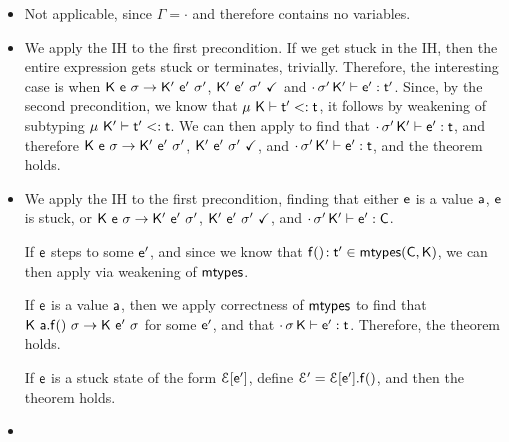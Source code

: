 \documentclass[a4paper,USenglish]{tex/lipics-v2016}
\begin{document}
\begin{itemize}
  \item {}
        Not applicable, since $\Gamma = \cdot$ and therefore contains no variables.
  \item {}

        We apply the IH to the first precondition. If we get stuck in the IH, then the entire
        expression gets stuck or terminates, trivially. Therefore, the interesting case is when
        ${{\sf{K}}}~{{\sf{e}}}~{\sigma} \rightarrow {{\ensuremath{{\sf{K'}}}}}~{{{{\sf{e'}}}}}~{{{\sigma'}}}$, ${{\sf{K'}}}~{{{\sf{e'}}}}~{{\sigma'}}~\checkmark$ and $\EnvType\cdot\sp\Kp\ep\tp$. Since, by the
        second precondition, we know that $\StrSub \M\K \tp \t$, it follows by weakening of subtyping $\StrSub\M\Kp\tp\t$.
        We can then apply  to find that $\EnvType\cdot\sp\Kp\ep\t$, and therefore ${{\sf{K}}}~{{\sf{e}}}~{\sigma} \rightarrow {{\ensuremath{{\sf{K'}}}}}~{{{{\sf{e'}}}}}~{{{\sigma'}}}$, ${{\sf{K'}}}~{{{\sf{e'}}}}~{{\sigma'}}~\checkmark$, and $\EnvType\cdot\sp\Kp\ep\t$, and the theorem holds.
  \item {}

        We apply the IH to the first precondition, finding that either ${\sf{e}}$ is a value ${\sf{a}}$, ${\sf{e}}$ is stuck, or ${{\sf{K}}}~{{\sf{e}}}~{\sigma} \rightarrow {{\ensuremath{{\sf{K'}}}}}~{{{{\sf{e'}}}}}~{{{\sigma'}}}$, ${{\sf{K'}}}~{{{\sf{e'}}}}~{{\sigma'}}~\checkmark$, and $\cdot\,{{\sigma'}}\,{{\sf{K'}}}\vdash {{\ensuremath{{\sf{e'}}}}} : {\sf{C}}$. 

        If ${\sf{e}}$ steps to some ${{{\sf{e'}}}}$, and since we know that $\Mtype\f{}\tp \in \classoff{\C}{\K}$, we can then apply  via weakening of ${\sf{mtypes}}$.

        If ${\sf{e}}$ is a value ${\sf{a}}$, then we apply correctness of ${\sf{mtypes}}$ to find that ${{\sf{K}}}~{{\sf{a}}.{\sf{f}}()}~{\sigma} \rightarrow {\ensuremath{{\sf{K}}}}~{{{{\sf{e'}}}}}~{\sigma}$ for some ${{{\sf{e'}}}}$, and that $\EnvType\cdot\s\K\ep\t$. Therefore, the theorem holds.

        If ${\sf{e}}$ is a stuck state of the form $\mathcal{E}[{{{\sf{e'}}}}]$, define $\mathcal{E}' = \mathcal{E}[{{{\sf{e'}}}}].{\sf{f}}()$, and then the theorem holds.
  \item {}


\end{itemize}
\end{document}
